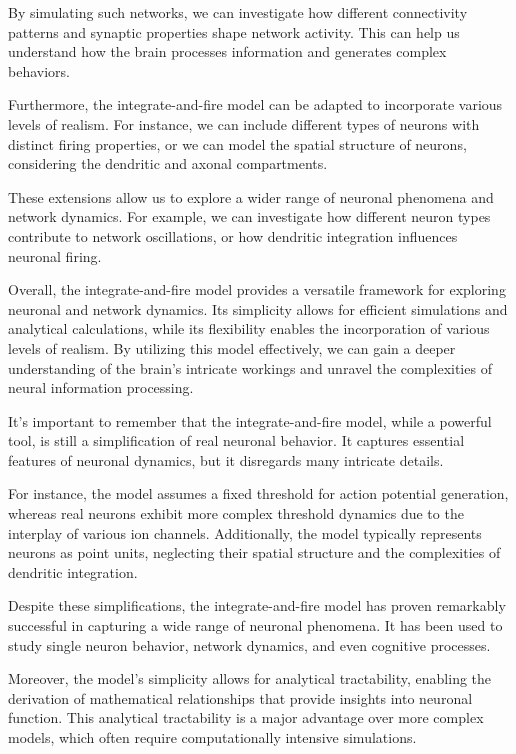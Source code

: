 By simulating such networks, we can investigate how different connectivity patterns and synaptic properties shape network activity. This can help us understand how the brain processes information and generates complex behaviors.

Furthermore, the integrate-and-fire model can be adapted to incorporate various levels of realism. For instance, we can include different types of neurons with distinct firing properties, or we can model the spatial structure of neurons, considering the dendritic and axonal compartments.

These extensions allow us to explore a wider range of neuronal phenomena and network dynamics. For example, we can investigate how different neuron types contribute to network oscillations, or how dendritic integration influences neuronal firing.

Overall, the integrate-and-fire model provides a versatile framework for exploring neuronal and network dynamics. Its simplicity allows for efficient simulations and analytical calculations, while its flexibility enables the incorporation of various levels of realism. By utilizing this model effectively, we can gain a deeper understanding of the brain's intricate workings and unravel the complexities of neural information processing.

It's important to remember that the integrate-and-fire model, while a powerful tool, is still a simplification of real neuronal behavior. It captures essential features of neuronal dynamics, but it disregards many intricate details.

For instance, the model assumes a fixed threshold for action potential generation, whereas real neurons exhibit more complex threshold dynamics due to the interplay of various ion channels. Additionally, the model typically represents neurons as point units, neglecting their spatial structure and the complexities of dendritic integration.

Despite these simplifications, the integrate-and-fire model has proven remarkably successful in capturing a wide range of neuronal phenomena. It has been used to study single neuron behavior, network dynamics, and even cognitive processes.

Moreover, the model's simplicity allows for analytical tractability, enabling the derivation of mathematical relationships that provide insights into neuronal function. This analytical tractability is a major advantage over more complex models, which often require computationally intensive simulations.

